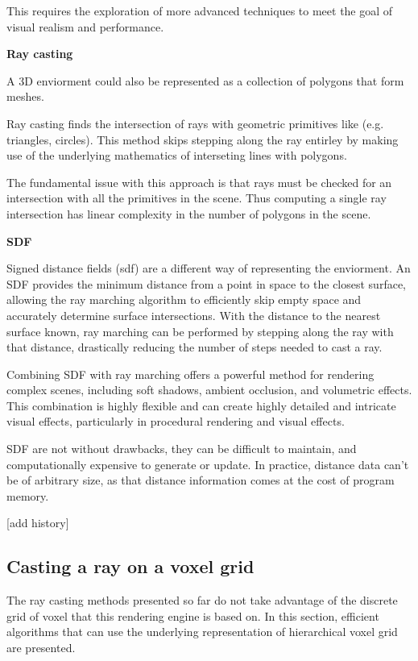 This requires the exploration of more advanced techniques to meet the goal of visual realism and performance.

\vspace{0.5cm}
\textbf{Ray casting}

A 3D enviorment could also be represented as a collection of polygons that form meshes.

Ray casting finds the intersection of rays with geometric primitives like (e.g. triangles, circles). This method skips stepping along the ray entirley by making use of the underlying mathematics of interseting lines with polygons.

The fundamental issue with this approach is that rays must be checked for an intersection with all the primitives in the scene. Thus computing a single ray intersection has linear complexity in the number of polygons in the scene.

\vspace{0.5cm}
\label{def:sdf}
\textbf{SDF}

Signed distance fields (\acrshort{sdf}) are a different way of representing the enviorment. An SDF provides the minimum distance from a point in space to the closest surface, allowing the ray marching algorithm to efficiently skip empty space and accurately determine surface intersections.
With the distance to the nearest surface known, ray marching can be performed by stepping along the ray with that distance, drastically reducing the number of steps needed to cast a ray.

Combining SDF with ray marching offers a powerful method for rendering complex scenes, including soft shadows, ambient occlusion, and volumetric effects.
This combination is highly flexible and can create highly detailed and intricate visual effects, particularly in procedural rendering and visual effects.

SDF are not without drawbacks, they can be difficult to maintain, and computationally expensive to generate or update. In practice, distance data can't be of arbitrary size, as that distance information comes at the cost of program memory.

[add history]

\subsection{Casting a ray on a voxel grid}
The ray casting methods presented so far do not take advantage of the discrete grid of voxel that this rendering engine is based on. In this section, efficient algorithms that can use the underlying representation of hierarchical voxel grid are presented.

